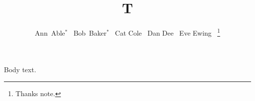 \documentclass[journal]{IEEEtran}
\begin{document}
\title{T}
\author{Ann~Able$^{*}$~\IEEEmembership{}
	Bob~Baker$^{*}$~\IEEEmembership{}
	Cat Cole~\IEEEmembership{}
	Dan Dee~\IEEEmembership{}
	Eve Ewing~\IEEEmembership{}
	\thanks{Thanks note.}%
}
\maketitle
Body text.
\end{document}
